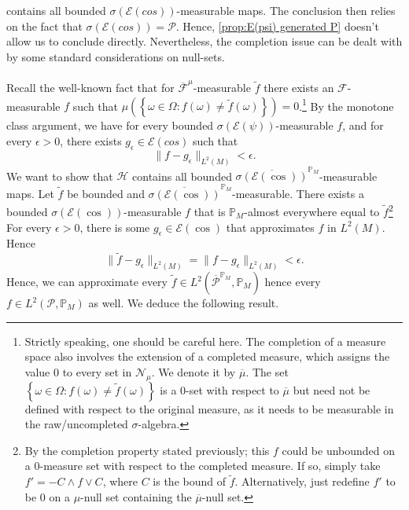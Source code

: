 \documentclass[11pt,a4paper,twoside,openany]{report}
\theoremstyle{plain} %
\theoremstyle{definition} %
\theoremstyle{remark} %
\begin{document}
contains all bounded \(\sigma(\mathcal{E}(cos))\)-measurable maps. The conclusion then relies on the fact that \(\sigma(\mathcal{E}(cos))=\mathcal{P}\).  Hence, \cref{prop:E(psi) generated P} doesn't allow us to conclude directly. Nevertheless, the completion issue can be dealt with by some standard considerations on null-sets.
\\\\
Recall the well-known fact that for \(\overline{\mathcal{F}}^{\mu}\)-measurable \(\widetilde{f}\)  there exists an \(\mathcal{F}\)-measurable \(f\) such that \(\mu(\left\{\omega\in\Omega:f(\omega)\neq \widetilde{f}(\omega)\right\})=0\).\footnote{Strictly speaking, one should be careful here. The completion of a measure space also involves the extension of a completed measure, which assigns the value \(0\) to every set in \(\mathcal{N}_{\mu}\). We denote it by \(\overline{\mu}\). The set \(\left\{\omega\in\Omega:f(\omega)\neq \widetilde{f}(\omega)\right\}\) is a \(0\)-set with respect to \(\overline{\mu}\) but need not be defined with respect to the original measure, as it needs to be measurable in the raw/uncompleted \(\sigma\)-algebra.} By the monotone class argument, we have for every bounded \(\sigma(\mathcal{E}(\psi))\)-measurable \(f\), and for every \(\epsilon>0\), there exists \(g_{\epsilon}\in \mathcal{E}(cos)\) such that 
 \begin{equation}
     \lVert f-g_{\epsilon}\rVert_{L^2(M)}<\epsilon.
 \end{equation}
 We want to show that \(\mathcal{H}\) contains all bounded \(\overline{\sigma(\mathcal{E}(\cos))}^{\mathbb{P}_M}\)-measurable maps. Let \(\widetilde{f}\) be bounded and \(\overline{\sigma(\mathcal{E}(\cos))}^{\mathbb{P}_M}\)-measurable. There exists a bounded \(\sigma(\mathcal{E}(\cos))\)-measurable \(f\) that is \(\mathbb{P}_M\)-almost everywhere equal to \(\widetilde{f}\)\footnote{By the completion property stated previously; this \(f\) could be unbounded on a \(0\)-measure set with respect to the completed measure. If so, simply take \(f'=-C\wedge f\vee C\), where \(C\) is the bound of \(\widetilde{f}\). Alternatively, just redefine \(f'\) to be \(0\) on a \(\mu\)-null set containing the \(\overline{\mu}\)-null set.} For every \(\epsilon>0\), there is some \(g_{\epsilon}\in\mathcal{E}(\cos)\) that approximates \(f\) in \(L^2(M)\). Hence 
 \begin{equation}
     \lVert \widetilde{f}-g_{\epsilon}\rVert_{L^2(M)}=\lVert f-g_{\epsilon}\rVert_{L^2(M)}<\epsilon.
 \end{equation}
 Hence, we can approximate every \(\widetilde{f}\in L^2(\overline{\mathcal{P}}^{\mathbb{P}_M},\mathbb{P}_M)\) hence every \(f\in L^2(\mathcal{P},\mathbb{P}_M)\) as well. We deduce the following result.
\end{document}
